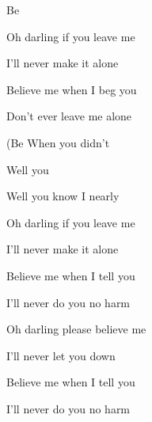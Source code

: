 

\zs
{}  

  

Be  

     
\ks

\zs
Oh darling if you leave me 

I'll never make it alone 

Believe me when I beg you 

Don't ever leave me alone  
\ks

\zr
(Be  When you  didn't  

Well you  

   

Well you know I nearly    
\kr

\zs
Oh darling if you leave me 

I'll never make it alone 

Believe me when I tell you 

I'll never do you no harm
\ks

\zr
\kr 

\zs
Oh darling please believe me 

I'll never let you down 

Believe me when I tell you 

I'll never do you no harm    
\ks

\kp
